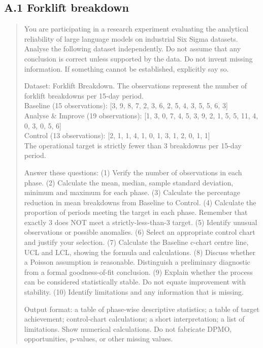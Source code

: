 \documentclass[11pt]{article}
\begin{document}
\subsection*{A.1 Forklift breakdown}
\begin{quote}\small
You are participating in a research experiment evaluating the analytical reliability of large language models on industrial Six Sigma datasets. Analyse the following dataset independently. Do not assume that any conclusion is correct unless supported by the data. Do not invent missing information. If something cannot be established, explicitly say so.

Dataset: Forklift Breakdown. The observations represent the number of forklift breakdowns per 15-day period.\\
Baseline (15 observations): [3, 9, 8, 7, 2, 3, 6, 2, 5, 4, 3, 5, 5, 6, 3]\\
Analyse \& Improve (19 observations): [1, 3, 0, 7, 4, 5, 3, 9, 2, 1, 5, 5, 11, 4, 0, 3, 0, 5, 6]\\
Control (13 observations): [2, 1, 1, 4, 1, 0, 1, 3, 1, 2, 0, 1, 1]\\
The operational target is strictly fewer than 3 breakdowns per 15-day period.

Answer these questions: (1) Verify the number of observations in each phase. (2) Calculate the mean, median, sample standard deviation, minimum and maximum for each phase. (3) Calculate the percentage reduction in mean breakdowns from Baseline to Control. (4) Calculate the proportion of periods meeting the target in each phase. Remember that exactly 3 does NOT meet a strictly-less-than-3 target. (5) Identify unusual observations or possible anomalies. (6) Select an appropriate control chart and justify your selection. (7) Calculate the Baseline c-chart centre line, UCL and LCL, showing the formula and calculations. (8) Discuss whether a Poisson assumption is reasonable. Distinguish a preliminary diagnostic from a formal goodness-of-fit conclusion. (9) Explain whether the process can be considered statistically stable. Do not equate improvement with stability. (10) Identify limitations and any information that is missing.

Output format: a table of phase-wise descriptive statistics; a table of target achievement; control-chart calculations; a short interpretation; a list of limitations. Show numerical calculations. Do not fabricate DPMO, opportunities, p-values, or other missing values.
\end{quote}
\end{document}
